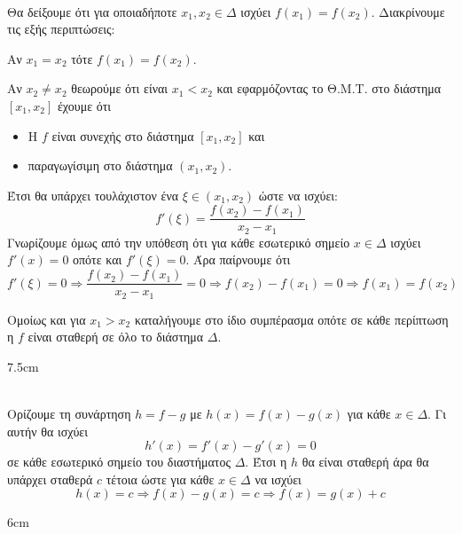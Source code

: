 \textbf{}\\
Θα δείξουμε ότι για οποιαδήποτε $ x_1,x_2\in\varDelta $ ισχύει $ f(x_1)=f(x_2) $. Διακρίνουμε τις εξής περιπτώσεις:
\begin{alist}
\item Αν $ x_1=x_2 $ τότε $ f(x_1)=f(x_2) $.
\item Αν $ x_2\neq x_2 $ θεωρούμε ότι είναι $ x_1<x_2 $ και εφαρμόζοντας το Θ.Μ.Τ. στο διάστημα $ [x_1,x_2] $ έχουμε ότι
\begin{itemize}
\item Η $ f $ είναι συνεχής στο διάστημα $ [x_1,x_2] $ και
\item παραγωγίσιμη στο διάστημα $ (x_1,x_2) $.
\end{itemize}
Έτσι θα υπάρχει τουλάχιστον ένα $ \xi\in(x_1,x_2) $ ώστε να ισχύει:
\[ f'(\xi)=\dfrac{f(x_2)-f(x_1)}{x_2-x_1} \]
Γνωρίζουμε όμως από την υπόθεση ότι για κάθε εσωτερικό σημείο $ x\in\varDelta $ ισχύει $ f'(x)=0 $ οπότε και $ f'(\xi)=0 $. Άρα παίρνουμε ότι
\[ f'(\xi)=0\Rightarrow \dfrac{f(x_2)-f(x_1)}{x_2-x_1}=0\Rightarrow f(x_2)-f(x_1)=0\Rightarrow f(x_1)=f(x_2) \]
\end{alist}
Ομοίως και για $ x_1>x_2 $ καταλήγουμε στο ίδιο συμπέρασμα οπότε σε κάθε περίπτωση η $ f $ είναι σταθερή σε όλο το διάστημα $ \varDelta $.
\begin{Thewrhmabox}{7.5cm}
\label{thewrhma:synepeies_thmt_2}
\end{Thewrhmabox}
\textbf{}\\
Ορίζουμε τη συνάρτηση $ h=f-g $ με $ h(x)=f(x)-g(x) $ για κάθε $ x\in\varDelta $. Γι αυτήν θα ισχύει 
\[ h'(x)=f'(x)-g'(x)=0 \]
σε κάθε εσωτερικό σημείο του διαστήματος $ \varDelta $. Έτσι η $ h $ θα είναι σταθερή άρα θα υπάρχει σταθερά $ c $ τέτοια ώστε για κάθε $ x\in\varDelta $ να ισχύει
\[ h(x)=c\Rightarrow f(x)-g(x)=c\Rightarrow f(x)=g(x)+c \] 
\begin{Thewrhmabox}{6cm}
\label{thewrhma:kritirio_monotonias}
\end{Thewrhmabox}
